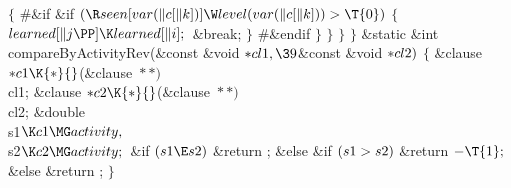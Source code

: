{{{{{${}\{{}$\6
\8\#\&{if} \1\6
\&{if} ${}(\R\\{seen}[\\{var}(\|c[\|k])]\W\\{level}(\\{var}(\|c[\|k]))>%
\T{0}){}$\5
${}\{{}$\1\6
${}\\{learned}[\|j\PP]\K\\{learned}[\|i];{}$\6
\&{break};\6
\4${}\}{}$\2\6
\8\#\&{endif}\6
\4${}\}{}$\2\6
\4${}\}{}$\2\6
\4${}\}{}$\2\6
\4${}\}{}$%
\C{**********************************************************************}\2\7
\&{static} \&{int} \\{compareByActivityRev}(\&{const} \&{void} ${}{*}\\{cl1},%
\39{}$\&{const} \&{void} ${}{*}\\{cl2}){}$\1\1\2\2\6
${}\{{}$\1\6
\&{clause} ${}{*}\\{c1}\K{*}{}$(\&{clause} ${}{*}{*}){}$ \\{cl1};\6
\&{clause} ${}{*}\\{c2}\K{*}{}$(\&{clause} ${}{*}{*}){}$ \\{cl2};\6
\&{double} \\{s1}${}\K\\{c1}\MG\\{activity},{}$ \\{s2}${}\K\\{c2}\MG%
\\{activity};{}$\7
\&{if} ${}(\\{s1}\E\\{s2}){}$\1\5
\&{return} ;\2\6
\&{else} \&{if} ${}(\\{s1}>\\{s2}){}$\1\5
\&{return} ${}{-}\T{1};{}$\2\6
\&{else}\1\5
\&{return} ;\2\6
\4${}\}{}$\2\par
\fi



}}}}}
